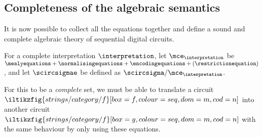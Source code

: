 \documentclass{lmcs}
\begin{document}
\subsection{Completeness of the algebraic semantics}\label{sec:algebraic-completeness}

It is now possible to collect all the equations together and define a sound and
complete algebraic theory of sequential digital circuits.

\begin{defi}
    For a complete interpretation \(\interpretation\), let
    \(\mce_{\interpretation}\) be \(
    \mealyequations +
    \normalisingequations +
    \encodingequations +
    (\restrictionequation)
    \), and let \(\scircsigmae\) be defined as
    \(\scircsigma / \mce_{\interpretation}\).
\end{defi}

For this to be a \emph{complete} set, we must be able to translate
a circuit \(
\iltikzfig{strings/category/f}[box=f,colour=seq,dom=m,cod=n]
\) into another circuit \(
\iltikzfig{strings/category/f}[box=g,colour=seq,dom=m,cod=n]
\) with the same behaviour by only using these equations.
\end{document}
